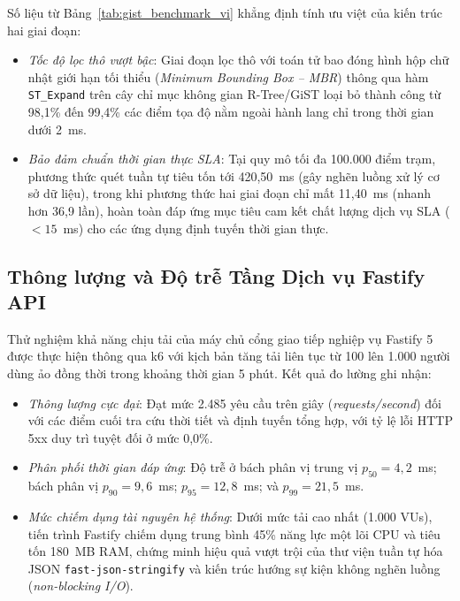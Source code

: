 Số liệu từ Bảng~\ref{tab:gist_benchmark_vi} khẳng định tính ưu việt của kiến trúc hai giai đoạn:
\begin{itemize}
    \item[-] \textit{Tốc độ lọc thô vượt bậc}: Giai đoạn lọc thô với toán tử bao đóng hình hộp chữ nhật giới hạn tối thiểu (\textit{Minimum Bounding Box -- MBR}) thông qua hàm \texttt{ST\_Expand} trên cây chỉ mục không gian R-Tree/GiST loại bỏ thành công từ 98,1\% đến 99,4\% các điểm tọa độ nằm ngoài hành lang chỉ trong thời gian dưới 2~ms.
    \item[-] \textit{Bảo đảm chuẩn thời gian thực SLA}: Tại quy mô tối đa 100.000 điểm trạm, phương thức quét tuần tự tiêu tốn tới 420,50~ms (gây nghẽn luồng xử lý cơ sở dữ liệu), trong khi phương thức hai giai đoạn chỉ mất 11,40~ms (nhanh hơn 36,9 lần), hoàn toàn đáp ứng mục tiêu cam kết chất lượng dịch vụ SLA ($< 15$~ms) cho các ứng dụng định tuyến thời gian thực.
\end{itemize}

\subsection{Thông lượng và Độ trễ Tầng Dịch vụ Fastify API}
Thử nghiệm khả năng chịu tải của máy chủ cổng giao tiếp nghiệp vụ Fastify 5 được thực hiện thông qua k6 với kịch bản tăng tải liên tục từ 100 lên 1.000 người dùng ảo đồng thời trong khoảng thời gian 5 phút. Kết quả đo lường ghi nhận:
\begin{itemize}
    \item[-] \textit{Thông lượng cực đại}: Đạt mức 2.485 yêu cầu trên giây (\textit{requests/second}) đối với các điểm cuối tra cứu thời tiết và định tuyến tổng hợp, với tỷ lệ lỗi HTTP 5xx duy trì tuyệt đối ở mức 0,0\%.
    \item[-] \textit{Phân phối thời gian đáp ứng}: Độ trễ ở bách phân vị trung vị $p_{50} = 4,2$~ms; bách phân vị $p_{90} = 9,6$~ms; $p_{95} = 12,8$~ms; và $p_{99} = 21,5$~ms.
    \item[-] \textit{Mức chiếm dụng tài nguyên hệ thống}: Dưới mức tải cao nhất (1.000 VUs), tiến trình Fastify chiếm dụng trung bình 45\% năng lực một lõi CPU và tiêu tốn 180~MB RAM, chứng minh hiệu quả vượt trội của thư viện tuần tự hóa JSON \texttt{fast-json-stringify} và kiến trúc hướng sự kiện không nghẽn luồng (\textit{non-blocking I/O}).
\end{itemize}

